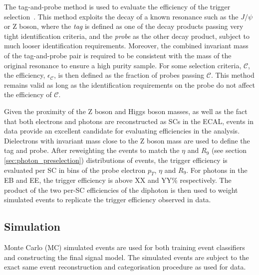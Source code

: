 The tag-and-probe method is used to evaluate the efficiency of the trigger selection~\cite{CMS:2011aa}. This method exploits the decay of a known resonance such as the $J/\psi$ or Z boson, where the \textit{tag} is defined as one of the decay products passing very tight identification criteria, and the \textit{probe} as the other decay product, subject to much looser identification requirements. Moreover, the combined invariant mass of the tag-and-probe pair is required to be consistent with the mass of the original resonance to ensure a high purity sample. For some selection criteria, $\mathcal{C}$, the efficiency, $\epsilon_{\mathcal{C}}$, is then defined as the fraction of probes passing $\mathcal{C}$. This method remains valid as long as the identification requirements on the probe do not affect the efficiency of $\mathcal{C}$.

Given the proximity of the Z boson and Higgs boson masses, as well as the fact that both electrons and photons are reconstructed as SCs in the ECAL, \Zee events in data provide an excellent candidate for evaluating efficiencies in the \Hgg analysis. Dielectrons with invariant mass close to the Z boson mass are used to define the tag and probe. After reweighting the \Zee events to match the $\eta$ and $R_9$ (see section \ref{sec:photon_preselection}) distributions of \Hgg events, the trigger efficiency is evaluated per SC in bins of the probe electron $p_T$, $\eta$ and $R_9$. For photons in the EB and EE, the trigger efficiency is above XX and YY\% respectively. The product of the two per-SC efficiencies of the diphoton is then used to weight simulated events to replicate the trigger efficiency observed in data.

\subsection{Simulation}
Monte Carlo (MC) simulated events are used for both training event classifiers and constructing the final signal model. The simulated events are subject to the exact same event reconstruction and categorisation procedure as used for data. 

